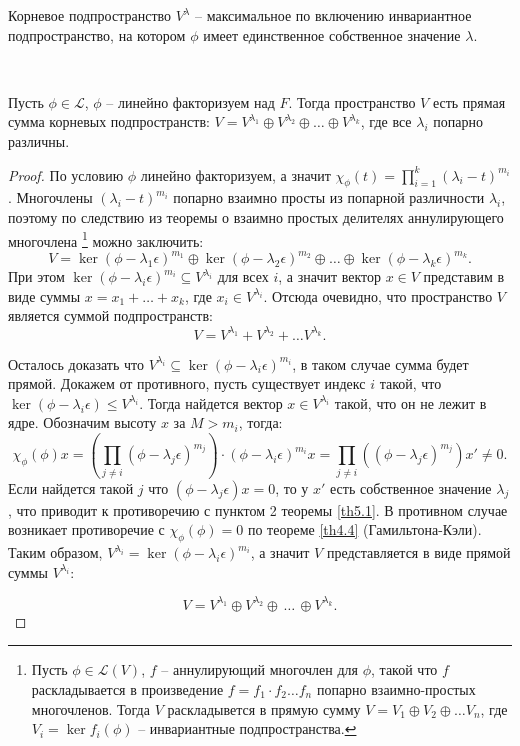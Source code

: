 \begin{corollary}
    Корневое подпространство $V^{\lambda}$ -- максимальное по включению инвариантное подпространство, 
    на котором $\phi$ имеет единственное собственное значение $\lambda$.
\end{corollary}

\begin{theorem}~
    \label{th5.2}

    Пусть $\phi \in \mathcal{L}$, $\phi$ -- линейно факторизуем над $F$.
    Тогда пространство $V$ есть прямая сумма корневых подпространств: 
    $V = V^{\lambda_1} \oplus V^{\lambda_2} \oplus \ldots \oplus V^{\lambda_k}$, где все $\lambda_i$ попарно различны.
\end{theorem}

\begin{proof}
    По условию $\phi$ линейно факторизуем, а значит
    $\chi_{\phi}(t) = \displaystyle\prod_{i= 1}^{k} (\lambda_i - t)^{m_i}$. Многочлены $(\lambda_i - t)^{m_i}$ попарно взаимно просты 
    из попарной различности $\lambda_i$, поэтому по следствию из теоремы о взаимно простых делителях аннулирующего многочлена \footnote{Пусть $\phi \in \mathcal{L}(V)$, $f$ -- аннулирующий многочлен для $\phi$, такой что $f$ 
    раскладывается в произведение $f = f_1 \cdot f_2 \dots f_n$ попарно взаимно-простых многочленов.
    Тогда $V$ раскладывется в прямую сумму $V = V_1 \oplus V_2 \oplus \dots V_n$, 
    где $V_i = \ker f_i(\phi)$ -- инвариантные подпространства.} можно заключить:
    $$V = \ker (\phi - \lambda_1 \epsilon)^{m_1} \oplus \ker (\phi - \lambda_2 \epsilon)^{m_2} 
    \oplus \dots \oplus \ker (\phi - \lambda_k \epsilon)^{m_k}.$$
    При этом $\ker (\phi - \lambda_i \epsilon)^{m_i} \subseteq V^{\lambda_i}$ для всех $i$,
    а значит вектор $x \in V$ представим в виде суммы 
    $x = x_1 + \ldots + x_k$, где $x_i \in V^{\lambda_i}$.
    Отсюда очевидно, что пространство $V$ является суммой подпространств: 
    $$V = V^{\lambda_1} + V^{\lambda_2} + \dots V^{\lambda_k}.$$ 
    
    Осталось доказать что $V^{\lambda_i} \subseteq \ker(\phi - \lambda_i \epsilon)^{m_i}$, 
    в таком случае сумма будет прямой. Докажем от противного, пусть существует индекс $i$ такой, 
    что $\ker (\phi - \lambda_i \epsilon) \leq V^{\lambda_i}$. Тогда найдется вектор 
    $x \in V^{\lambda_i}$ такой, что он не лежит в ядре. Обозначим высоту $x$ за $M > m_i$, тогда:
    $$\chi_{\phi}(\phi) x = \left(\displaystyle\prod_{j \neq i} (\phi - \lambda_j \epsilon)^{m_j}\right) \cdot 
    (\phi - \lambda_i \epsilon)^{m_i} x = \displaystyle\prod_{j \neq i} 
    ((\phi - \lambda_j \epsilon)^{m_j})x' \neq 0.$$ 
    Если найдется такой $j$ что $(\phi - \lambda_j \epsilon)x = 0$, то у $x'$ есть собственное значение
    $\lambda_j$, что приводит к противоречию с пунктом 2 теоремы \ref{th5.1}. 
    В противном случае возникает противоречие с 
    $\chi_{\phi}(\phi) = 0$ по теореме \ref{th4.4} (Гамильтона-Кэли). 
    Таким образом, $V^{\lambda_i} = \ker(\phi - \lambda_i \epsilon)^{m_i}$, а значит $V$ представляется 
    в виде прямой суммы $V^{\lambda_i}$:

    $$V = V^{\lambda_1} \oplus V^{\lambda_2} \oplus \, \dots \, \oplus V^{\lambda_k}.$$
\end{proof}
